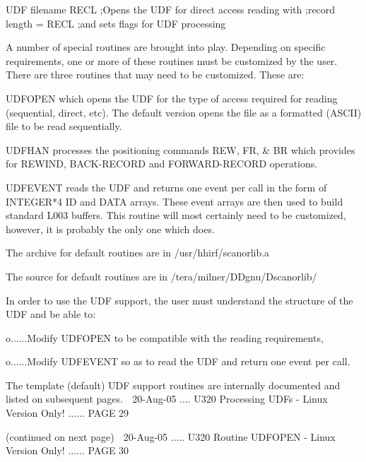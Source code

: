    UDF filename RECL ;Opens the UDF for direct access reading with
                     ;record length = RECL
                     ;and sets flags for UDF processing
 
   A number of special routines are brought into play. Depending  on  specific
   requirements, one or more of these routines must be customized by the user.
   There are three routines that may need to be customized. These are:
 
   UDFOPEN  which  opens  the  UDF for the type of access required for reading
          (sequential, direct, etc). The default version opens the file  as  a
          formatted (ASCII) file to be read sequentially.
 
   UDFHAN  processes the positioning commands REW, FR, & BR which provides for
          REWIND, BACK-RECORD and FORWARD-RECORD operations.
 
   UDFEVENT reads the UDF and returns one  event  per  call  in  the  form  of
          INTEGER*4  ID  and  DATA arrays. These event arrays are then used to
          build standard L003 buffers. This routine will most  certainly  need
          to be customized, however, it is probably the only one which does.
 
   The archive for default routines are in /usr/hhirf/scanorlib.a
 
   The source  for default routines are in /tera/milner/DDgnu/Dscanorlib/
 
   In  order to use the UDF support, the user must understand the structure of
   the UDF and be able to:
 
   o......Modify UDFOPEN to be compatible with the reading requirements,
 
   o......Modify UDFEVENT so as to read the UDF and return one event per call.
 
 
   The template (default) UDF support routines are internally  documented  and
   listed on subsequent pages.
    
   20-Aug-05 .... U320  Processing  UDFs - Linux Version Only! ...... PAGE  29
 
 
 
 
                            (continued on next page)
    
   20-Aug-05 ..... U320  Routine UDFOPEN - Linux Version Only! ...... PAGE  30
 
